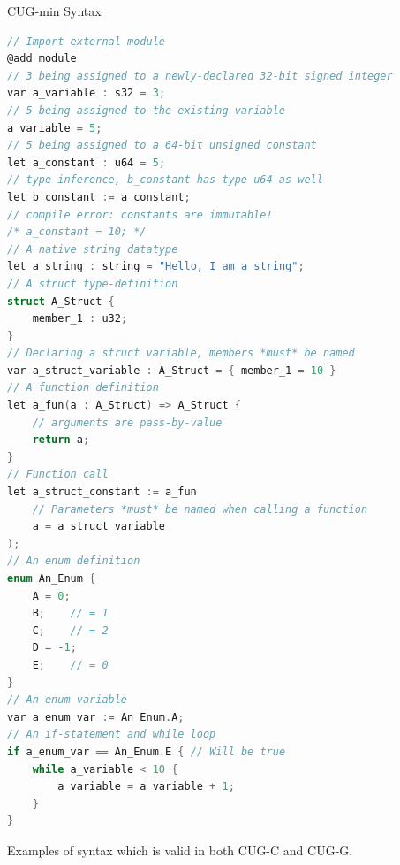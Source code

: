 \documentclass[a4paper,12pt,twoside,openright]{report}
\begin{document}
\begin{lstfloat}
\begin{center} CUG-min Syntax \end{center}
\begin{lstlisting}[language=C]
// Import external module
@add module
// 3 being assigned to a newly-declared 32-bit signed integer
var a_variable : s32 = 3;
// 5 being assigned to the existing variable
a_variable = 5;
// 5 being assigned to a 64-bit unsigned constant
let a_constant : u64 = 5;
// type inference, b_constant has type u64 as well
let b_constant := a_constant;
// compile error: constants are immutable!
/* a_constant = 10; */
// A native string datatype
let a_string : string = "Hello, I am a string";
// A struct type-definition
struct A_Struct {
    member_1 : u32;
}
// Declaring a struct variable, members *must* be named
var a_struct_variable : A_Struct = { member_1 = 10 }
// A function definition
let a_fun(a : A_Struct) => A_Struct {
    // arguments are pass-by-value
    return a;
}
// Function call
let a_struct_constant := a_fun
    // Parameters *must* be named when calling a function
    a = a_struct_variable
);
// An enum definition
enum An_Enum {
    A = 0;
    B;    // = 1
    C;    // = 2
    D = -1;
    E;    // = 0
}
// An enum variable
var a_enum_var := An_Enum.A;
// An if-statement and while loop
if a_enum_var == An_Enum.E { // Will be true
    while a_variable < 10 {
        a_variable = a_variable + 1;
    }
}
\end{lstlisting}
\caption{Examples of syntax which is valid in both CUG-C and CUG-G.}
\label{lst:cug_min_syntax}
\end{lstfloat}
\end{document}
